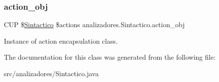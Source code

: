 \subsubsection{\texorpdfstring{action\+\_\+obj}{action\_obj}}
{\footnotesize\ttfamily C\+UP \$\mbox{\hyperlink{classanalizadores_1_1_sintactico}{Sintactico}} \$actions analizadores.\+Sintactico.\+action\+\_\+obj\hspace{0.3cm}{\ttfamily [protected]}}

Instance of action encapsulation class. 

The documentation for this class was generated from the following file\+:\begin{DoxyCompactItemize}
\item 
src/analizadores/Sintactico.\+java\end{DoxyCompactItemize}
